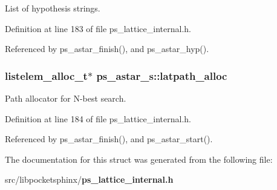 List of hypothesis strings. 



Definition at line 183 of file ps\-\_\-lattice\-\_\-internal.\-h.



Referenced by ps\-\_\-astar\-\_\-finish(), and ps\-\_\-astar\-\_\-hyp().

\subsubsection[{latpath\-\_\-alloc}]{\setlength{\rightskip}{0pt plus 5cm}listelem\-\_\-alloc\-\_\-t$\ast$ ps\-\_\-astar\-\_\-s\-::latpath\-\_\-alloc}\label{structps__astar__s_a754bce124cd92b1b2b6aa6dbbcd73cee}


Path allocator for N-\/best search. 



Definition at line 184 of file ps\-\_\-lattice\-\_\-internal.\-h.



Referenced by ps\-\_\-astar\-\_\-finish(), and ps\-\_\-astar\-\_\-start().



The documentation for this struct was generated from the following file\-:\begin{DoxyCompactItemize}
\item 
src/libpocketsphinx/{\bf ps\-\_\-lattice\-\_\-internal.\-h}\end{DoxyCompactItemize}

